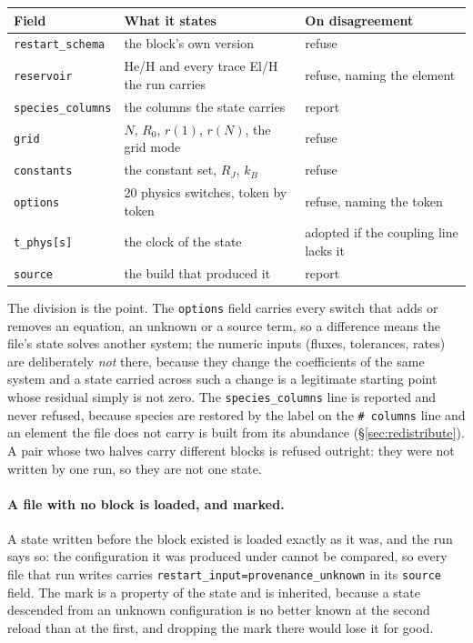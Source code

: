 \documentclass[english,a4paper]{my_memo}
\begin{document}
\begin{center}\small
\begin{tabular}{@{}lll@{}}
\toprule
Field & What it states & On disagreement \\
\midrule
\verb|restart_schema| & the block's own version & refuse \\
\verb|reservoir| & He/H and every trace El/H the run carries & refuse, naming the element \\
\verb|species_columns| & the columns the state carries & report \\
\verb|grid| & $N$, $R_0$, $r(1)$, $r(N)$, the grid mode & refuse \\
\verb|constants| & the constant set, $R_J$, $k_B$ & refuse \\
\verb|options| & 20 physics switches, token by token & refuse, naming the token \\
\verb|t_phys[s]| & the clock of the state & adopted if the coupling line lacks it \\
\verb|source| & the build that produced it & report \\
\bottomrule
\end{tabular}
\end{center}

The division is the point. The \verb|options| field carries every switch
that adds or removes an equation, an unknown or a source term, so a
difference means the file's state solves another system; the numeric inputs
(fluxes, tolerances, rates) are deliberately \emph{not} there, because they
change the coefficients of the same system and a state carried across such a
change is a legitimate starting point whose residual simply is not zero. The
\verb|species_columns| line is reported and never refused, because species
are restored by the label on the \verb|# columns| line and an element the
file does not carry is built from its abundance (\S\ref{sec:redistribute}).
A pair whose two halves carry different blocks is refused outright: they
were not written by one run, so they are not one state.

\paragraph{A file with no block is loaded, and marked.} A state written
before the block existed is loaded exactly as it was, and the run says so:
the configuration it was produced under cannot be compared, so every file
that run writes carries \verb|restart_input=provenance_unknown| in its
\verb|source| field. The mark is a property of the state and is inherited,
because a state descended from an unknown configuration is no better known
at the second reload than at the first, and dropping the mark there would
lose it for good.
\end{document}
